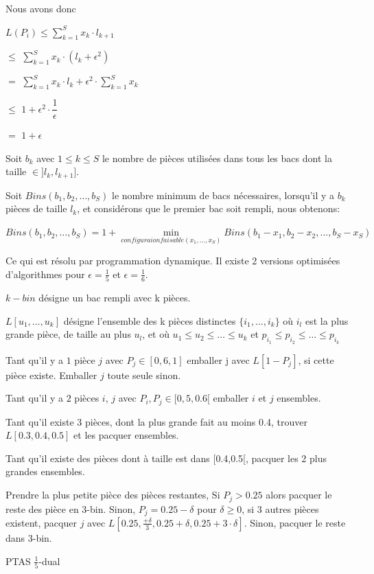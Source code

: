 \documentclass[a4paper,12pt]{report}
\theoremstyle{plain}				%
\theoremstyle{definition}				%
\begin{document}
Nous avons donc

$L(P_i) \le \sum_{k=1}^{S}x_k \cdot l_{k+1}$

$\le$
$\sum_{k=1}^{S}x_k \cdot (l_k+\epsilon^2)$

$=$
$\sum_{k=1}^{S}x_k \cdot l_k  +  \epsilon^2 \cdot \sum_{k=1}^{S}x_k$

$\le$
$1 + \epsilon^2 \cdot \dfrac{1}{\epsilon}$

$=$
$1 + \epsilon$

\bigskip
Soit $b_k$ avec $1 \le k \le S$ le nombre de pièces utilisées dans tous les bacs dont la taille $\in ]l_k, l_{k+1}]$.

Soit $Bins(b_1, b_2, \ldots, b_S)$ le nombre minimum de bacs
nécessaires, lorsqu'il y a $b_k$ pièces de taille $l_k$, et
considérons que le premier bac soit rempli, nous obtenons:

$Bins(b_1, b_2, \ldots, b_S) = 1 + \underset{configuraion faisable (x_1, \ldots, x_S)}{\min} Bins(b_1-x_1, b_2-x_2, \ldots, b_S-x_S)$

Ce qui est résolu par programmation dynamique.
Il existe 2 versions optimisées d'algorithmes pour 
$\epsilon = \frac{1}{5}$ et 
$\epsilon = \frac{1}{6}$.

\bigskip

$k-bin$ désigne un bac rempli avec k pièces.

$L[u_1, \ldots, u_k]$ désigne l'ensemble des 
k pièces distinctes $\{i_1, \ldots, i_k\}$ 
où $i_l$ est la plus grande pièce, de taille au plus $u_l$, 
et où $u_1 \leq u_2 \leq \ldots \leq u_k$ et 
$p_{i_1} \leq p_{i_2} \leq \ldots \leq p_{i_k}$ 


\begin{algorithm}[H]
\DontPrintSemicolon

Tant qu'il y a $1$ pièce $j$ avec $P_j \in [0,6, 1]$ emballer j avec $L[1 - P_j]$, si cette pièce existe. Emballer $j$ toute seule sinon.

\BlankLine %
Tant qu'il y a $2$ pièces $i$, $j$ avec $P_i, P_j \in [0,5, 0.6[$ emballer $i$ et $j$ ensembles.

\BlankLine %
Tant qu'il existe $3$ pièces, dont la plus grande fait au moins 0.4, trouver $L[0.3,0.4,0.5]$ et les pacquer ensembles.

\BlankLine %
Tant qu'il existe des pièces dont à taille est dans [0.4,0.5[, pacquer les $2$ plus grandes ensembles.

\BlankLine %
Prendre la plus petite pièce des pièces restantes, Si $P_j > 0.25$ 
alors pacquer le reste des pièce en 3-bin. 
Sinon, $P_j = 0.25 - \delta$ pour $\delta \geq 0$, 
 si $3$ autres pièces existent, pacquer $j$ 
 avec $L[0.25, \frac{+\delta}{3}, 0.25 + \delta, 0.25 + 3 \cdot \delta]$. 
Sinon, pacquer le reste dans 3-bin.


\caption{PTAS $\frac{1}{5}$-dual}
\label{algo:PTASDual1_5}
\end{algorithm}
\end{document}
